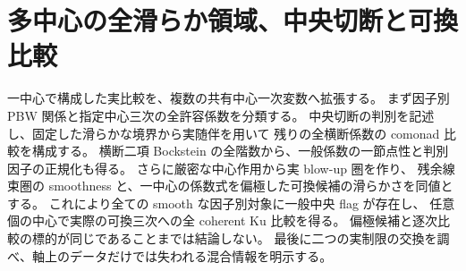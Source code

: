 \section{多中心の全滑らか領域、中央切断と可換比較}
\label{mct:sec:multicentral}

一中心で構成した実比較を、複数の共有中心一次変数へ拡張する。
まず因子別 PBW 関係と指定中心三次の全許容係数を分類する。
中央切断の判別を記述し、固定した滑らかな境界から実随伴を用いて
残りの全横断係数の comonad 比較を構成する。
横断二項 Bockstein の全階数から、一般係数の一節点性と判別因子の正規化も得る。
さらに厳密な中心作用から実 blow-up 圏を作り、
残余線束圏の smoothness と、一中心の係数式を偏極した可換候補の滑らかさを同値とする。
これにより全ての smooth な因子別対象に一般中央 flag が存在し、
任意個の中心で実際の可換三次への全 coherent Ku 比較を得る。
偏極候補と逐次比較の標的が同じであることまでは結論しない。
最後に二つの実制限の交換を調べ、軸上のデータだけでは失われる混合情報を明示する。









